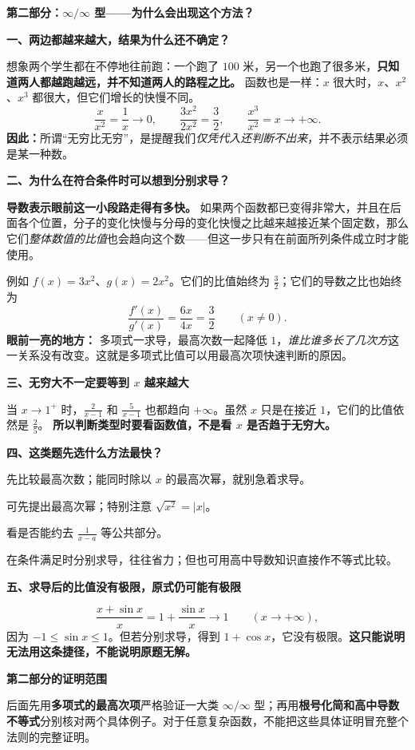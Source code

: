 \clearpage
\begin{explanationbox}
\textbf{\textcolor{CExplanation}{第二部分：$\infty/\infty$ 型——为什么会出现这个方法？}}

\textbf{一、两边都越来越大，结果为什么还不确定？}

想象两个学生都在不停地往前跑：一个跑了 $100$ 米，另一个也跑了很多米，\textbf{只知道两人都越跑越远，并不知道两人的路程之比。}
函数也是一样：$x$ 很大时，$x$、$x^2$、$x^3$ 都很大，但它们增长的快慢不同。
\[
\frac{x}{x^2}=\frac1x\to0,\qquad
\frac{3x^2}{2x^2}=\frac32,\qquad
\frac{x^3}{x^2}=x\to+\infty.
\]
\textbf{因此：}所谓“无穷比无穷”，是提醒我们\emph{仅凭代入还判断不出来}，并不表示结果必须是某一种数。

\medskip
\textbf{\textcolor{CExplanation}{二、为什么在符合条件时可以想到分别求导？}}

\textbf{导数表示眼前这一小段路走得有多快。} 如果两个函数都已变得非常大，并且在后面各个位置，分子的变化快慢与分母的变化快慢之比越来越接近某个固定数，那么它们\emph{整体数值的比值}也会趋向这个数——但这一步只有在前面所列条件成立时才能使用。

例如 $f(x)=3x^2$、$g(x)=2x^2$。它们的比值始终为 $\frac32$；它们的导数之比也始终为
\[
\frac{f'(x)}{g'(x)}=\frac{6x}{4x}=\frac32\qquad (x\ne0).
\]
\textbf{眼前一亮的地方：} 多项式一求导，最高次数一起降低 $1$，\emph{谁比谁多长了几次方}这一关系没有改变。这就是多项式比值可以用最高次项快速判断的原因。

\medskip
\textbf{\textcolor{CExplanation}{三、无穷大不一定要等到 $x$ 越来越大}}

当 $x\to1^+$ 时，$\frac{2}{x-1}$ 和 $\frac{5}{x-1}$ 也都趋向 $+\infty$。虽然 $x$ 只是在接近 $1$，它们的比值依然是 $\frac25$。
\textbf{所以判断类型时要看函数值，不是看 $x$ 是否趋于无穷大。}

\medskip
\textbf{\textcolor{CExplanation}{四、这类题先选什么方法最快？}}

\begin{description}[style=nextline, leftmargin=2.5em, labelsep=0.4em, itemsep=0.35em]
\item[\textbf{两个多项式：}] 先比较最高次数；能同时除以 $x$ 的最高次幂，就别急着求导。
\item[\textbf{带有根号：}] 可先提出最高次幂；特别注意 $\sqrt{x^2}=|x|$。
\item[\textbf{靠近某点时两边变大：}] 看是否能约去 $\frac1{x-a}$ 等公共部分。
\item[\textbf{对数等不便直接比较的函数：}] 在条件满足时分别求导，往往省力；但也可用高中导数知识直接作不等式比较。
\end{description}

\medskip
\textbf{\textcolor{CExplanation}{五、求导后的比值没有极限，原式仍可能有极限}}

\[
\frac{x+\sin x}{x}=1+\frac{\sin x}{x}\longrightarrow1
\qquad(x\to+\infty),
\]
因为 $-1\le\sin x\le1$。但若分别求导，得到 $1+\cos x$，它没有极限。\textbf{这只能说明无法用这条捷径，不能说明原题无解。}

\medskip
\textbf{\textcolor{CProof}{第二部分的证明范围}}

后面先用\textbf{多项式的最高次项}严格验证一大类 $\infty/\infty$ 型；再用\textbf{根号化简和高中导数不等式}分别核对两个具体例子。对于任意复杂函数，不能把这些具体证明冒充整个法则的完整证明。
\end{explanationbox}
